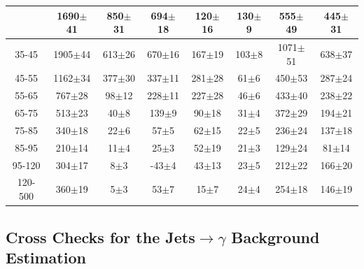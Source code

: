 \begin{table}[h]
\begin{center}
\begin{tabular}{|c|c|c|c|c|c|c|c|}
{30-35 & 1690$\pm$41 & 850$\pm$31 & 694$\pm$18 & 120$\pm$16 & 130$\pm$9 & 555$\pm$49 & 445$\pm$31 \\ \hline
35-45 & 1905$\pm$44 & 613$\pm$26 & 670$\pm$16 & 167$\pm$19 & 103$\pm$8 & 1071$\pm$51 & 638$\pm$37 \\ \hline
45-55 & 1162$\pm$34 & 377$\pm$30 & 337$\pm$11 & 281$\pm$28 & 61$\pm$6 & 450$\pm$53 & 287$\pm$24 \\ \hline
55-65 & 767$\pm$28 & 98$\pm$12 & 228$\pm$11 & 227$\pm$28 & 46$\pm$6 & 433$\pm$40 & 238$\pm$22 \\ \hline
65-75 & 513$\pm$23 & 40$\pm$8 & 139$\pm$9 & 90$\pm$18 & 31$\pm$4 & 372$\pm$29 & 194$\pm$21 \\ \hline
75-85 & 340$\pm$18 & 22$\pm$6 & 57$\pm$5 & 62$\pm$15 & 22$\pm$5 & 236$\pm$24 & 137$\pm$18 \\ \hline
85-95 & 210$\pm$14 & 11$\pm$4 & 25$\pm$3 & 52$\pm$19 & 21$\pm$3 & 129$\pm$24 & 81$\pm$14 \\ \hline
95-120 & 304$\pm$17 & 8$\pm$3 & -43$\pm$4 & 43$\pm$13 & 23$\pm$5 & 212$\pm$22 & 166$\pm$20 \\ \hline
120-500 & 360$\pm$19 & 5$\pm$3 & 53$\pm$7 & 15$\pm$7 & 24$\pm$4 & 254$\pm$18 & 146$\pm$19 \\ \hline
  \end{tabular}
  \label{tab:yields_Wg_to_enu_}
  \end{center}
\end{table}

\subsection{Cross Checks for the Jets$\rightarrow\gamma$ Background Estimation}
\label{sec:AN_BackSubtr_Closure}

